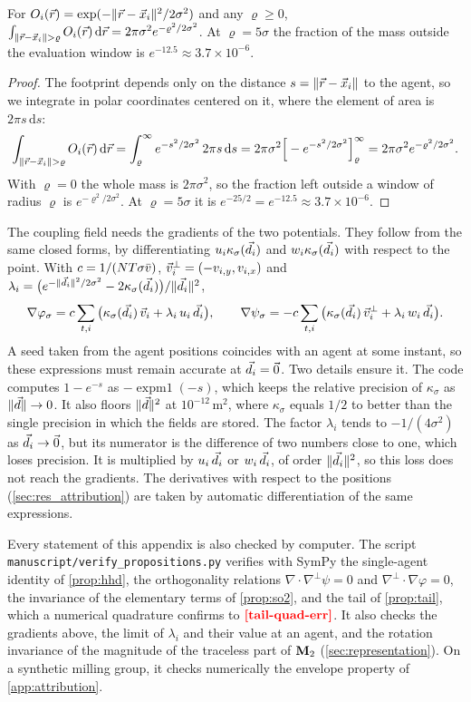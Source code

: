 \begin{proposition}\label{prop:tail}
For $O_i(\vec{r})=\exp(-\|\vec{r}-\vec{x}_i\|^2/2\sigma^2)$ and any $\varrho\ge0$,
$\int_{\|\vr-\vx_i\|>\varrho}O_i(\vr)\,\mathrm{d}\vr=2\pi\sigma^2e^{-\varrho^2/2\sigma^2}$. At $\varrho=5\sigma$
the fraction of the mass outside the evaluation window is $e^{-12.5}\approx3.7\times10^{-6}$.
\end{proposition}
\begin{proof}
The footprint depends only on the distance $s=\|\vec{r}-\vec{x}_i\|$ to the agent, so we integrate in polar
coordinates centered on it, where the element of area is $2\pi s\,\mathrm{d}s$:
\[
\int_{\|\vr-\vx_i\|>\varrho}O_i(\vr)\,\mathrm{d}\vr=\int_\varrho^\infty e^{-s^2/2\sigma^2}\,2\pi s\,\mathrm{d}s
=2\pi\sigma^2\Big[-e^{-s^2/2\sigma^2}\Big]_{\varrho}^{\infty}=2\pi\sigma^2e^{-\varrho^2/2\sigma^2}.
\]
With $\varrho=0$ the whole mass is $2\pi\sigma^2$, so the fraction left outside a window of radius
$\varrho$ is $e^{-\varrho^2/2\sigma^2}$. At $\varrho=5\sigma$ it is $e^{-25/2}=e^{-12.5}\approx3.7\times10^{-6}$.
\end{proof}

The coupling field needs the gradients of the two potentials. They follow from the same closed forms,
by differentiating $u_i\kappa_\sigma(\vec{d}_i)$ and $w_i\kappa_\sigma(\vec{d}_i)$ with respect to the point. With
$c=1/(NT\sigma\bar v)$, $\vec{v}_i^{\perp}=(-v_{i,y},v_{i,x})$ and
$\lambda_i=\big(e^{-\|\vec{d}_i\|^2/2\sigma^2}-2\kappa_\sigma(\vec{d}_i)\big)/\|\vec{d}_i\|^2$,
\[
\nabla\varphi_\sigma=c\sum_{t,i}\big(\kappa_\sigma(\vec{d}_i)\,\vec{v}_i+\lambda_i\,u_i\,\vec{d}_i\big),\qquad
\nabla\psi_\sigma=-c\sum_{t,i}\big(\kappa_\sigma(\vec{d}_i)\,\vec{v}_i^{\perp}+\lambda_i\,w_i\,\vec{d}_i\big).
\]
A seed taken from the agent positions coincides with an agent at some instant, so these expressions must remain
accurate at $\vec{d}_i=\vec 0$. Two details ensure it. The code computes $1-e^{-s}$ as $-\operatorname{expm1}(-s)$,
which keeps the relative precision of $\kappa_\sigma$ as $\|\vec{d}\|\to0$. It also floors $\|\vec{d}\|^2$ at
$10^{-12}$\,m$^2$, where $\kappa_\sigma$ equals $1/2$ to better than the single precision in which the
fields are stored. The factor $\lambda_i$ tends to $-1/(4\sigma^2)$ as $\vec{d}_i\to\vec 0$, but its numerator is
the difference of two numbers close to one, which loses precision. It is multiplied by $u_i\,\vec{d}_i$ or
$w_i\,\vec{d}_i$, of order $\|\vec{d}_i\|^2$, so this loss does not reach the gradients. The derivatives with respect
to the positions (\cref{sec:res_attribution}) are taken by automatic differentiation of the same
expressions.

Every statement of this appendix is also checked by computer. The script
\nolinkurl{manuscript/verify_propositions.py} verifies with SymPy the single-agent identity of
\cref{prop:hhd}, the orthogonality relations $\nabla\cdot\nabla^{\perp}\psi=0$ and
$\nabla^{\perp}\cdot\nabla\varphi=0$, the invariance of the elementary terms of \cref{prop:so2}, and the
tail of \cref{prop:tail}, which a numerical quadrature confirms to $\nm{tail-quad-err}$. It also checks
the gradients above, the limit of $\lambda_i$ and their value at an agent, and the rotation invariance of
the magnitude of the traceless part of $\mathbf{M}_2$ (\cref{sec:representation}). On a synthetic milling group, it
checks numerically the envelope property of \cref{app:attribution}.
